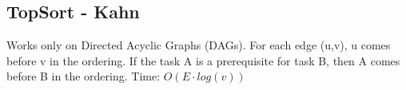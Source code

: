 \subsection{TopSort - Kahn}

Works only on Directed Acyclic Graphs (DAGs). For each edge (u,v), u comes before v in the ordering.
If the task A is a prerequisite for task B, then A comes before B in the ordering.
Time: $O(E \cdot log(v))$